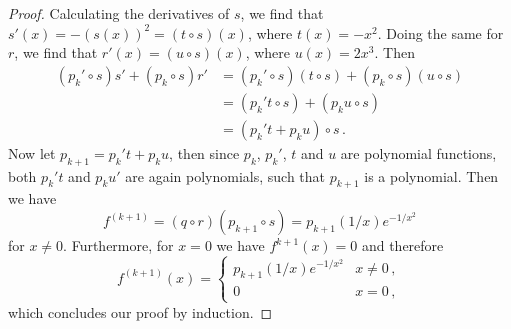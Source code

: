 \documentclass[week=6]{homework}
\begin{document}
\begin{questions}
\begin{parts}
\begin{proof}
		    	Calculating the derivatives of $s$, we find that $s'(x) = -(s(x))^2 = (t \circ s)(x)$, where $t(x) = -x^2$. Doing the same for $r$, we find that $r'(x) = (u \circ s)(x)$, where $u(x) = 2x^3$. Then
		    	\begin{align*}
			    	(p_k' \circ s)s'  + (p_k \circ s)r' &= (p_k' \circ s)(t \circ s)  + (p_k \circ s)(u \circ s) \\
			    	&= (p_k't \circ s)  + (p_ku \circ s) \\
			    	&= (p_k't + p_ku)\circ s\,.
		    	\end{align*}
		    	Now let $p_{k+1} = p_k't + p_ku$, then since  $p_k$, $p_k'$, $t$ and $u$ are polynomial functions, both $p_k't$ and $p_ku'$ are again polynomials, such that $p_{k+1}$ is a polynomial.
		    	Then we have
		    	\[
			    	f^{(k+1)} = (q\circ r)(p_{k+1}\circ s)= p_{k+1}(1/x)e^{-1/x^2}
			    \]
			    for $x \neq 0$. Furthermore, for $x = 0$ we have $f^{k+1}(x) = 0$ and therefore
		    	\[
		    	f^{(k+1)}(x) = \begin{cases} p_{k+1}(1/x)e^{-1/x^2} & x\neq 0\,, \\ 0 & x = 0\,, \end{cases}
		    	\]
		    	which concludes our proof by induction.
	    	\end{proof}
	    \end{parts}
     \end{questions}
\end{document}
